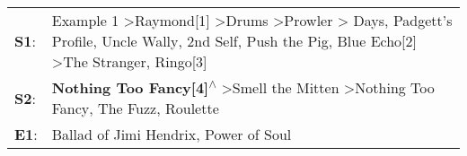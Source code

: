 \begin{supertabular}{p{0.03\textwidth}p{0.92\textwidth}}
 \textbf{S1}:  &  Example 1\textsuperscript{} \textgreater \enspace Raymond[1]\textsuperscript{} \textgreater \enspace Drums\textsuperscript{} \textgreater \enspace Prowler\textsuperscript{} \textgreater {} Days\textsuperscript{}, \enspace Padgett's Profile\textsuperscript{}, \enspace Uncle Wally\textsuperscript{}, \enspace 2nd Self\textsuperscript{}, \enspace Push the Pig\textsuperscript{}, \enspace Blue Echo[2]\textsuperscript{} \textgreater \enspace The Stranger\textsuperscript{}, \enspace Ringo[3]\textsuperscript{}  \enspace  \\
 \textbf{S2}:  &                                                                                                                                                                                                                                                                                 \textbf{Nothing Too Fancy[4]\textsuperscript{$\wedge$}} \textgreater \enspace Smell the Mitten\textsuperscript{} \textgreater \enspace Nothing Too Fancy\textsuperscript{}, \enspace The Fuzz\textsuperscript{}, \enspace Roulette\textsuperscript{}  \enspace  \\
 \textbf{E1}:  &                                                                                                                                                                                                                                                                                                                                                                                                                                                   Ballad of Jimi Hendrix\textsuperscript{}, \enspace Power of Soul\textsuperscript{}  \enspace  \\
\end{supertabular}
